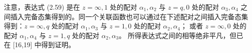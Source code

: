 
注意，表达式 (2.59) 是在 $z=\infty,1$ 处的配对 $\alpha_1,\alpha_2$ 与 $z=q,0$ 处的配对
$\alpha_3,\alpha_4$ 之间插入完备态集得到的。同一个关联函数也可以通过在下述配对之间插入完备态集
得到：$z=\infty,q$ 处的配对 $\alpha_1,\alpha_3$ 与 $z=1,0$ 处的配对 $\alpha_2,\alpha_4$；
或者 $z=\infty,0$ 处的配对 $\alpha_1,\alpha_4$ 与 $z=1,q$ 处的配对 $\alpha_2,\alpha_3$。
所得表达式之间的相等绝非平凡，但已在 [16,19] 中得到证明。

